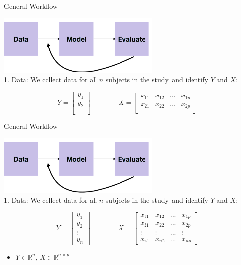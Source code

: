 \documentclass[
  ignorenonframetext,
]{beamer}
\providecommand{\tightlist}{%
  \setlength{\itemsep}{0pt}\setlength{\parskip}{0pt}}
\begin{document}
\begin{frame}{General Workflow}
\protect\hypertarget{general-workflow-1}{}
\centering

\includegraphics[width=0.6\textwidth,height=\textheight]{image3.png}\\
1. Data: We collect data for all \(n\) subjects in the study, and
identify \(Y\) and \(X\):

\[ Y = \begin{bmatrix}
           y_{1} \\
           y_{2} \\
                  \\
         \end{bmatrix}  \qquad \qquad  X = \begin{bmatrix}
           x_{11}& x_{12} &...&x_{1p}\\
           x_{21}& x_{22} &...&x_{2p} \\
           & & &
         \end{bmatrix} \]
\end{frame}

\begin{frame}{General Workflow}
\protect\hypertarget{general-workflow-2}{}
\centering

\includegraphics[width=0.6\textwidth,height=\textheight]{image3.png}\\
1. Data: We collect data for all \(n\) subjects in the study, and
identify \(Y\) and \(X\):

\[ Y = \begin{bmatrix}
           y_{1} \\
           y_{2} \\
           \vdots \\
           y_{n}
         \end{bmatrix}  \qquad \qquad  X = \begin{bmatrix}
           x_{11}& x_{12} &...&x_{1p}\\
           x_{21}& x_{22} &...&x_{2p} \\
           \vdots &\vdots& ...&\vdots\\
           x_{n1}& x_{n2} &...&x_{np}
         \end{bmatrix} \]

\begin{itemize}
\tightlist
\item
  \(Y \in \mathbb{R}^{n}\), \(X \in \mathbb{R}^{n \times p}\)
\end{itemize}
\end{frame}
\end{document}
